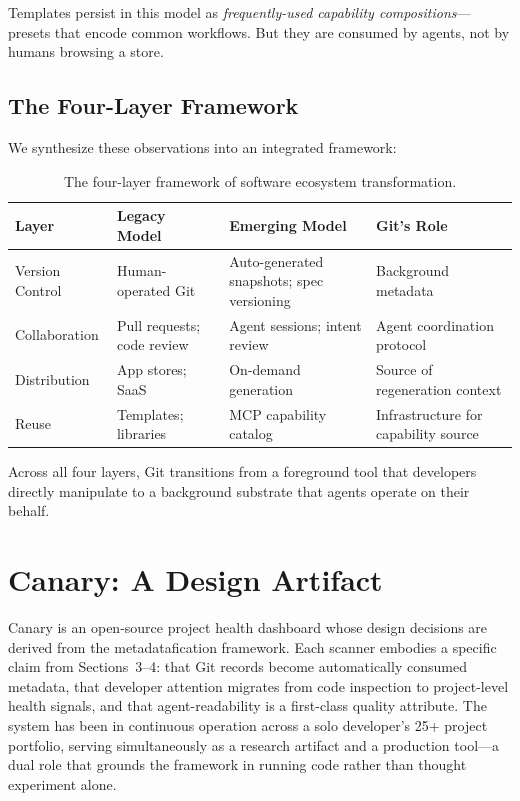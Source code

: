 \documentclass[sigconf, nonacm, anonymous=false]{acmart}
\begin{document}
Templates persist in this model as \textit{frequently-used capability compositions}---presets that encode common workflows. But they are consumed by agents, not by humans browsing a store.

\subsection{The Four-Layer Framework}

We synthesize these observations into an integrated framework:

\begin{table}[h]
\centering
\small
\begin{tabularx}{\textwidth}{lXXX}
\toprule
\textbf{Layer} & \textbf{Legacy Model} & \textbf{Emerging Model} & \textbf{Git's Role} \\
\midrule
Version Control & Human-operated Git & Auto-generated snapshots; spec versioning & Background metadata \\
Collaboration & Pull requests; code review & Agent sessions; intent review & Agent coordination protocol \\
Distribution & App stores; SaaS & On-demand generation & Source of regeneration context \\
Reuse & Templates; libraries & MCP capability catalog & Infrastructure for capability source \\
\bottomrule
\end{tabularx}
\caption{The four-layer framework of software ecosystem transformation.}
\label{tab:framework}
\end{table}

Across all four layers, Git transitions from a foreground tool that developers directly manipulate to a background substrate that agents operate on their behalf.

\section{Canary: A Design Artifact}

Canary is an open-source project health dashboard whose design decisions are derived from the metadatafication framework. Each scanner embodies a specific claim from Sections~3--4: that Git records become automatically consumed metadata, that developer attention migrates from code inspection to project-level health signals, and that agent-readability is a first-class quality attribute. The system has been in continuous operation across a solo developer's 25+ project portfolio, serving simultaneously as a research artifact and a production tool---a dual role that grounds the framework in running code rather than thought experiment alone.
\end{document}

